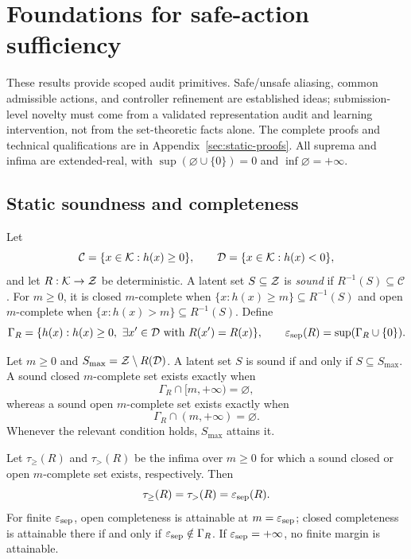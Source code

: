 \section{Foundations for safe-action sufficiency}\label{sec:theory-v1}

These results provide scoped audit primitives.  Safe/unsafe aliasing, common admissible actions,
and controller refinement are established ideas; submission-level novelty must come from a
validated representation audit and learning intervention, not from the set-theoretic facts alone.
The complete proofs and technical qualifications are in Appendix~\ref{sec:static-proofs}.  All
suprema and infima are extended-real, with
$\sup(\varnothing\cup\{0\})=0$ and $\inf\varnothing=+\infty$.

\subsection{Static soundness and completeness}

Let
\[
 \mathcal C=\{x\in\mathcal{K}:h(x)\geq0\},\qquad
 \mathcal D=\{x\in\mathcal{K}:h(x)<0\},
\]
and let $R:\mathcal{K}\to\mathcal{Z}$ be deterministic.  A latent set $S\subseteq\mathcal{Z}$ is
\emph{sound} if $R^{-1}(S)\subseteq\mathcal C$.  For $m\geq0$, it is closed $m$-complete when
$\{x:h(x)\geq m\}\subseteq R^{-1}(S)$ and open $m$-complete when
$\{x:h(x)>m\}\subseteq R^{-1}(S)$.  Define
\[
 \Gamma_R=\{h(x):h(x)\geq0,\ \exists x'\in\mathcal D\text{ with }R(x')=R(x)\},
 \qquad \varepsilon_{\mathrm{sep}}(R)=\sup(\Gamma_R\cup\{0\}).
\]

\begin{theorem}\label{thm:exact-existence}
Let $m\geq0$ and $S_{\max}=\mathcal{Z}\setminus R(\mathcal D)$.  A latent set $S$ is sound if and only if
$S\subseteq S_{\max}$.  A sound closed $m$-complete set exists exactly when
\begin{equation}
 \Gamma_R\cap[m,+\infty)=\varnothing,\label{eq:closed-completeness}
\end{equation}
whereas a sound open $m$-complete set exists exactly when
\begin{equation}
 \Gamma_R\cap(m,+\infty)=\varnothing.\label{eq:open-completeness}
\end{equation}
Whenever the relevant condition holds, $S_{\max}$ attains it.
\end{theorem}

\begin{proposition}\label{prop:threshold}
Let $\tau_{\geq}(R)$ and $\tau_{>}(R)$ be the infima over $m\geq0$ for which a sound closed or open
$m$-complete set exists, respectively.  Then
\[
 \tau_{\geq}(R)=\tau_{>}(R)=\varepsilon_{\mathrm{sep}}(R).
\]
For finite $\varepsilon_{\mathrm{sep}}$, open completeness is attainable at $m=\varepsilon_{\mathrm{sep}}$; closed completeness is
attainable there if and only if $\varepsilon_{\mathrm{sep}}\notin\Gamma_R$.  If $\varepsilon_{\mathrm{sep}}=+\infty$, no finite margin is
attainable.
\end{proposition}

